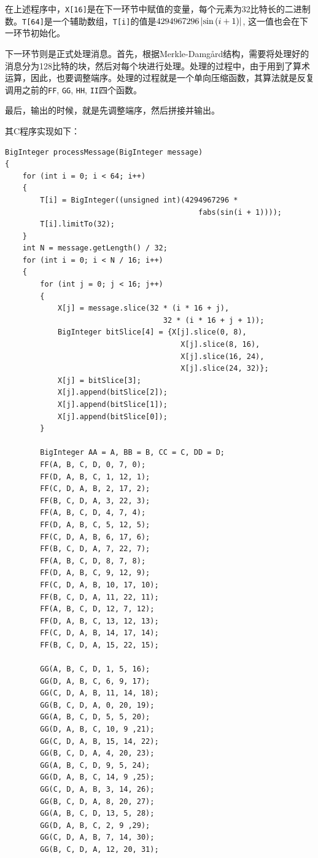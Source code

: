 在上述程序中，\verb`X[16]`是在下一环节中赋值的变量，每个元素为32比特长的二进制数。\verb`T[64]`是一个辅助数组，\verb`T[i]`的值是$4294967296\left| \sin\left( {i+1}\right) \right|$, 这一值也会在下一环节初始化。\par
下一环节则是正式处理消息。首先，根据Merkle-Damg\aa rd结构，需要将处理好的消息分为128比特的块，然后对每个块进行处理。处理的过程中，由于用到了算术运算，因此，也要调整端序。处理的过程就是一个单向压缩函数，其算法就是反复调用之前的\verb`FF`, \verb`GG`, \verb`HH`, \verb`II`四个函数。\par
最后，输出的时候，就是先调整端序，然后拼接并输出。\par
其C程序实现如下：
\begin{prove}
\begin{verbatim}
BigInteger processMessage(BigInteger message)
{
    for (int i = 0; i < 64; i++)
    {
        T[i] = BigInteger((unsigned int)(4294967296 * 
                                            fabs(sin(i + 1))));
        T[i].limitTo(32);
    }
    int N = message.getLength() / 32;
    for (int i = 0; i < N / 16; i++)
    {
        for (int j = 0; j < 16; j++)
        {
            X[j] = message.slice(32 * (i * 16 + j), 
                                    32 * (i * 16 + j + 1));
            BigInteger bitSlice[4] = {X[j].slice(0, 8), 
                                        X[j].slice(8, 16), 
                                        X[j].slice(16, 24), 
                                        X[j].slice(24, 32)};
            X[j] = bitSlice[3];
            X[j].append(bitSlice[2]);
            X[j].append(bitSlice[1]);
            X[j].append(bitSlice[0]);
        }
        
        BigInteger AA = A, BB = B, CC = C, DD = D;
        FF(A, B, C, D, 0, 7, 0);
        FF(D, A, B, C, 1, 12, 1);
        FF(C, D, A, B, 2, 17, 2);
        FF(B, C, D, A, 3, 22, 3);
        FF(A, B, C, D, 4, 7, 4);
        FF(D, A, B, C, 5, 12, 5);
        FF(C, D, A, B, 6, 17, 6);
        FF(B, C, D, A, 7, 22, 7);
        FF(A, B, C, D, 8, 7, 8);
        FF(D, A, B, C, 9, 12, 9);
        FF(C, D, A, B, 10, 17, 10);
        FF(B, C, D, A, 11, 22, 11);
        FF(A, B, C, D, 12, 7, 12);
        FF(D, A, B, C, 13, 12, 13);
        FF(C, D, A, B, 14, 17, 14);
        FF(B, C, D, A, 15, 22, 15);
        
        GG(A, B, C, D, 1, 5, 16);
        GG(D, A, B, C, 6, 9, 17);
        GG(C, D, A, B, 11, 14, 18);
        GG(B, C, D, A, 0, 20, 19);
        GG(A, B, C, D, 5, 5, 20);
        GG(D, A, B, C, 10, 9 ,21);
        GG(C, D, A, B, 15, 14, 22);
        GG(B, C, D, A, 4, 20, 23);
        GG(A, B, C, D, 9, 5, 24);
        GG(D, A, B, C, 14, 9 ,25);
        GG(C, D, A, B, 3, 14, 26);
        GG(B, C, D, A, 8, 20, 27);
        GG(A, B, C, D, 13, 5, 28);
        GG(D, A, B, C, 2, 9 ,29);
        GG(C, D, A, B, 7, 14, 30);
        GG(B, C, D, A, 12, 20, 31);
        

\end{verbatim}
\end{prove}
